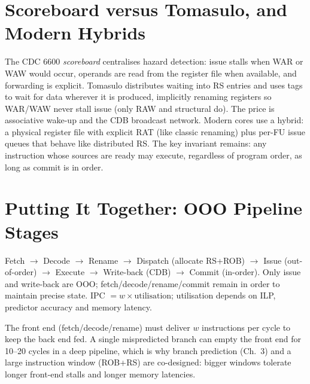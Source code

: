 \section{Scoreboard versus Tomasulo, and Modern Hybrids}
The CDC 6600 \textit{scoreboard} centralises hazard detection: issue stalls when WAR or WAW would occur, operands are read from the register file when available, and forwarding is explicit. Tomasulo distributes waiting into RS entries and uses tags to wait for data wherever it is produced, implicitly renaming registers so WAR/WAW never stall issue (only RAW and structural do). The price is associative wake-up and the CDB broadcast network. Modern cores use a hybrid: a physical register file with explicit RAT (like classic renaming) plus per-FU issue queues that behave like distributed RS. The key invariant remains: any instruction whose sources are ready may execute, regardless of program order, as long as commit is in order.

\section{Putting It Together: OOO Pipeline Stages}
Fetch $\to$ Decode $\to$ Rename $\to$ Dispatch (allocate RS+ROB) $\to$ Issue (out-of-order) $\to$ Execute $\to$ Write-back (CDB) $\to$ Commit (in-order). Only issue and write-back are OOO; fetch/decode/rename/commit remain in order to maintain precise state. IPC $=w \times \text{utilisation}$; utilisation depends on ILP, predictor accuracy and memory latency.

The front end (fetch/decode/rename) must deliver $w$ instructions per cycle to keep the back end fed. A single mispredicted branch can empty the front end for 10--20 cycles in a deep pipeline, which is why branch prediction (Ch.~3) and a large instruction window (ROB+RS) are co-designed: bigger windows tolerate longer front-end stalls and longer memory latencies.

\begin{center}
\end{center}

